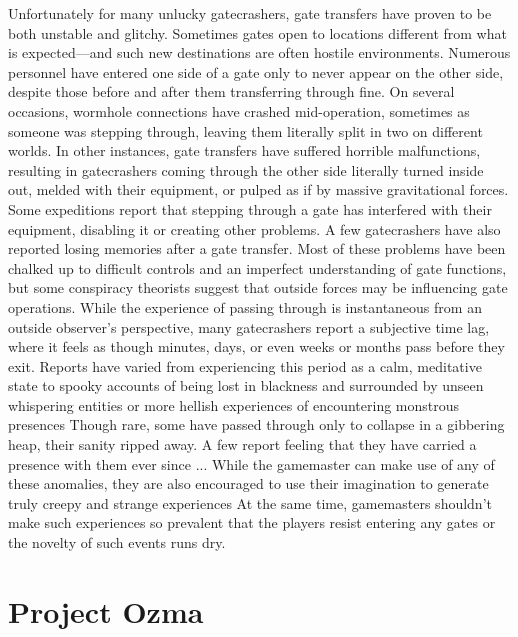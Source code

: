 Unfortunately for many unlucky gatecrashers, gate 
transfers have proven to be both unstable and glitchy. 
Sometimes gates open to locations different from what 
is expected—and such new destinations are often hostile
environments. Numerous personnel have entered
one side of a gate only to never appear on the other 
side, despite those before and after them transferring 
through fine. On several occasions, wormhole connections
have crashed mid-operation, sometimes as
someone was stepping through, leaving them literally 
split in two on different worlds. In other instances, 
gate transfers have suffered horrible malfunctions, 
resulting in gatecrashers coming through the other 
side literally turned inside out, melded with their 
equipment, or pulped as if by massive gravitational 
forces. Some expeditions report that stepping through 
a gate has interfered with their equipment, disabling 
it or creating other problems. A few gatecrashers have 
also reported losing memories after a gate transfer. 
Most of these problems have been chalked up to difficult
controls and an imperfect understanding of gate
functions, but some conspiracy theorists suggest that 
outside forces may be influencing gate operations. 
While the experience of passing through is instantaneous
from an outside observer's perspective, many
gatecrashers report a subjective time lag, where it feels 
as though minutes, days, or even weeks or months 
pass before they exit. Reports have varied from 
experiencing this period as a calm, meditative state 
to spooky accounts of being lost in blackness and 
surrounded by unseen whispering entities or more 
hellish experiences of encountering monstrous presences
Though rare, some have passed through only to
collapse in a gibbering heap, their sanity ripped away. 
A few report feeling that they have carried a presence 
with them ever since ...
While the gamemaster can make use of any of 
these anomalies, they are also encouraged to use their 
imagination to generate truly creepy and strange experiences
At the same time, gamemasters shouldn't
make such experiences so prevalent that the players 
resist entering any gates or the novelty of such events 
runs dry.

\section{Project Ozma}

